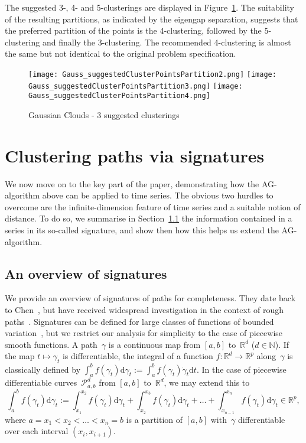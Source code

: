 \documentclass{amsart}[11pt]
\numberwithin{equation}{section}
\theoremstyle{definition}
\newcommand{\Pp}{\mathcal{P}}
\newcommand{\RR}{\mathbb{R}}
\newcommand{\D}{\mathrm{d}}
\newcommand{\Pab}{\Pp_{a,b}^{d}}
\begin{document}
The suggested 3-, 4- and 5-clusterings are displayed in Figure~\ref{fig:gaussian-clouds-suggested-clusterings}. 
The suitability of the resulting partitions, as indicated by the eigengap separation, suggests that the preferred partition of the points is the 4-clustering, followed by the 5-clustering and finally the 3-clustering. The recommended 4-clustering is almost the same but not identical to the original problem specification. 

\begin{figure}[ht]
    \centering
        \texttt{[image: Gauss\_suggestedClusterPointsPartition2.png]}
        \texttt{[image: Gauss\_suggestedClusterPointsPartition3.png]}
        \texttt{[image: Gauss\_suggestedClusterPointsPartition4.png]}
        \caption{Gaussian Clouds - 3 suggested clusterings}
        \label{fig:gaussian-clouds-suggested-clusterings}
\end{figure}

\section{Clustering paths via signatures}\label{sec:ClusteringSign}
We now move on to the key part of the paper, demonstrating how the AG-algorithm above can be applied to time series.
The obvious two hurdles to overcome are the infinite-dimension feature of time series
and a suitable notion of distance.
To do so, we summarise in Section~\ref{sec:Signature} the information contained in a series in its so-called signature,
and show then how this helps us extend the AG-algorithm.

\subsection{An overview of signatures}\label{sec:Signature}
We provide an overview of signatures of paths for completeness.
They date back to Chen~\cite{Chen58}, but have received widespread investigation in the context of rough paths~\cite{Boedihardjo, Lyons10}.
Signatures can be defined for large classes of functions of bounded variation~\cite{FrizVictoir},
but we restrict our analysis for simplicity to the case of piecewise smooth functions.
A path~$\gamma$ is a continuous map from $[a,b]$ to~$\RR^d$ ($d\in\mathbb{N}$).
If the map $t \mapsto \gamma_t$ is differentiable,
the integral of a function $f:\RR^d \to \RR^p$
along~$\gamma$ is classically defined by
$\int_a^b f(\gamma_t) \D{\gamma_t} := \int_a^b f(\gamma_t) \dot{\gamma}_t \D{t}$.
In the case of piecewise differentiable curves~$\Pab$ from $[a,b]$ to~$\RR^d$, we may extend this to
$$
\int_{a}^{b} f(\gamma_t) \D{\gamma_t} := \int_{x_1}^{x_2} f(\gamma_t) \D{\gamma_t}  + \int_{x_2}^{x_3} f(\gamma_t) \D{\gamma_t} + \ldots + \int_{x_{n-1}}^{x_n} f(\gamma_t) \D{\gamma_t}
\in\RR^p,
$$
where $a = x_1 < x_2 < \ldots < x_n = b$ is a partition of $[a,b]$ with~$\gamma$ differentiable over each interval $(x_i, x_{i+1})$.
\end{document}
